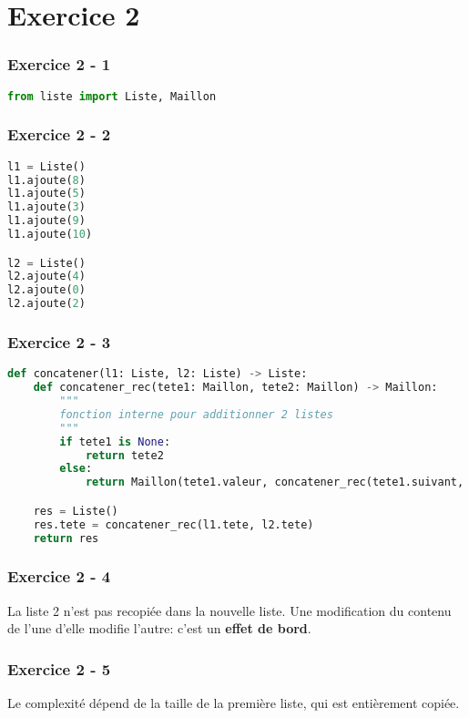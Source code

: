 \documentclass[svgnames,11pt]{beamer}
\begin{document}
\section{Exercice 2}
\begin{frame}[fragile]
    \frametitle{Exercice 2 - 1}

\begin{lstlisting}[language=Python , basicstyle=\ttfamily\small, xleftmargin=2em, xrightmargin=2em]
from liste import Liste, Maillon
\end{lstlisting}    

\end{frame}
\begin{frame}[fragile]
    \frametitle{Exercice 2 - 2}

\begin{lstlisting}[language=Python , basicstyle=\ttfamily\small, xleftmargin=2em, xrightmargin=2em]
l1 = Liste()
l1.ajoute(8)
l1.ajoute(5)
l1.ajoute(3)
l1.ajoute(9)
l1.ajoute(10)

l2 = Liste()
l2.ajoute(4)
l2.ajoute(0)
l2.ajoute(2)
\end{lstlisting}    

\end{frame}
\begin{frame}[fragile]
    \frametitle{Exercice 2 - 3}

\begin{lstlisting}[language=Python , basicstyle=\ttfamily\small, xleftmargin=2em, xrightmargin=2em]
def concatener(l1: Liste, l2: Liste) -> Liste:
    def concatener_rec(tete1: Maillon, tete2: Maillon) -> Maillon:
        """
        fonction interne pour additionner 2 listes
        """
        if tete1 is None:
            return tete2
        else:
            return Maillon(tete1.valeur, concatener_rec(tete1.suivant, tete2))

    res = Liste()
    res.tete = concatener_rec(l1.tete, l2.tete)
    return res
\end{lstlisting}    

\end{frame}
\begin{frame}
    \frametitle{Exercice 2 - 4}

La liste 2 n'est pas recopiée dans la nouvelle liste. Une modification du contenu de l'une d'elle modifie l'autre: c'est un \textbf{effet de bord}.

\end{frame}
\begin{frame}
    \frametitle{Exercice 2 - 5}

Le complexité dépend de la taille de la première liste, qui est entièrement copiée.

\end{frame}
\end{document}
